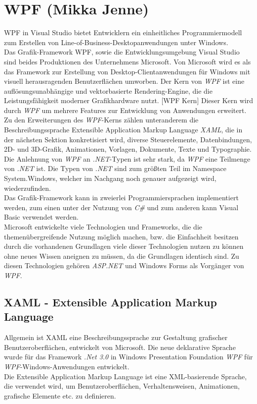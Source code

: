 \section{WPF (Mikka Jenne)}
\ac{WPF} in Visual Studio bietet Entwicklern ein einheitliches Programmiermodell zum 
Erstellen von Line-of-Business-Desktopanwendungen unter Windows. \cite{wpfmicrosoft.2020a} 
\\Das Grafik-Framework \acs{WPF}, sowie die Entwicklungsumgebung Visual Studio sind beides Produktionen des Unternehmens Microsoft.
Von Microsoft wird es als das Framework zur Erstellung von Desktop-Clientanwendungen für Windows mit visuell herausragenden 
Benutzerflächen umworben.
\linebreak
Der Kern von \textit{WPF} ist eine auflösungsunabhängige und vektorbasierte Rendering-Engine, die die Leistungsfähigkeit 
moderner Grafikhardware nutzt. [WPF Kern] Dieser Kern wird durch \textit{WPF} um mehrere Features zur Entwicklung von Anwendungen 
erweitert. Zu den Erweiterungen des \textit{WPF}-Kerns zählen unteranderem die Beschreibungssprache Extensible Application Markup Language \textit{XAML}, 
die in der nächsten Sektion konkretisiert wird, diverse Steuerelemente, Datenbindungen, 2D- und 3D-Grafik, Animationen, Vorlagen, Dokumente, Texte 
und Typographie.
\\Die Anlehnung von \textit{WPF} an \textit{.NET}-Typen ist sehr stark, da \textit{WPF} eine Teilmenge von \textit{.NET} ist. Die Typen von \textit{.NET} sind zum größten Teil im 
Namespace System.Windows, welcher im Nachgang noch genauer aufgezeigt wird, wiederzufinden. 
\\Das Grafik-Framework kann in zweierlei Programmiersprachen implementiert werden, zum einen unter der Nutzung von \textit{C\#} und zum anderen kann 
Visual Basic verwendet werden. 
\\Microsoft entwickelte viele Technologien und Frameworks, die die themenübergreifende Nutzung möglich machen, bzw. die Einfachheit besitzen 
durch die vorhandenen Grundlagen viele dieser Technologien nutzen zu können ohne neues Wissen aneignen zu müssen, da die Grundlagen identisch 
sind. Zu diesen Technologien gehören \textit{ASP.NET} und Windows Forms als Vorgänger von \textit{WPF}.
\subsection{XAML - Extensible Application Markup Language} %
Allgemein ist \ac{XAML} eine Beschreibungssprache zur Gestaltung grafischer Benutzeroberflächen, entwickelt von Microsoft. Die neue deklarative 
Sprache wurde für das Framework \textit{.Net 3.0} in Windows Presentation Foundation \textit{WPF} für \textit{WPF}-Windows-Anwendungen entwickelt. \cite{wpf.2020a} 
\\Die Extensible Application Markup Language ist eine XML-basierende Sprache, die verwendet wird, um Benutzeroberflächen, Verhaltensweisen, 
Animationen, grafische Elemente etc. zu definieren. 

